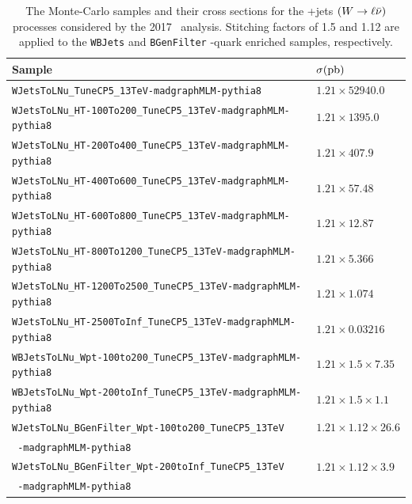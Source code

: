\begin{table}[htbp]
  \caption[\bosW+jets $(\bosW \rightarrow \ell\bar{\nu})$ Samples for \VHbb\ 2017]{The Monte-Carlo samples and their cross sections for the \bosW+jets $(\bosW \rightarrow \ell\bar{\nu})$ processes considered by the 2017 \VHbb\ analysis. Stitching factors of 1.5 and 1.12 are applied to the \texttt{WBJets} and \texttt{BGenFilter} \qrkb-quark enriched samples, respectively.}
  \label{tbl:MCWtoLNu}
  \small
  \begin{tabularx}{6.5in}{lX}
    \hline
    Sample                                                                 & $\sigma (\mathrm{pb})$                 \\
    \hline
    \texttt{WJetsToLNu\_TuneCP5\_13TeV-madgraphMLM-pythia8}                & $1.21 \times 52940.0$          \\
    \texttt{WJetsToLNu\_HT-100To200\_TuneCP5\_13TeV-madgraphMLM-pythia8}   & $1.21 \times 1395.0$           \\
    \texttt{WJetsToLNu\_HT-200To400\_TuneCP5\_13TeV-madgraphMLM-pythia8}   & $1.21 \times 407.9$            \\
    \texttt{WJetsToLNu\_HT-400To600\_TuneCP5\_13TeV-madgraphMLM-pythia8}   & $1.21 \times 57.48$            \\
    \texttt{WJetsToLNu\_HT-600To800\_TuneCP5\_13TeV-madgraphMLM-pythia8}   & $1.21 \times 12.87$            \\
    \texttt{WJetsToLNu\_HT-800To1200\_TuneCP5\_13TeV-madgraphMLM-pythia8}  & $1.21 \times 5.366$            \\
    \texttt{WJetsToLNu\_HT-1200To2500\_TuneCP5\_13TeV-madgraphMLM-pythia8} & $1.21 \times 1.074$            \\
    \texttt{WJetsToLNu\_HT-2500ToInf\_TuneCP5\_13TeV-madgraphMLM-pythia8}  & $1.21 \times 0.03216$          \\
    \texttt{WBJetsToLNu\_Wpt-100to200\_TuneCP5\_13TeV-madgraphMLM-pythia8} & $1.21 \times 1.5 \times 7.35$  \\
    \texttt{WBJetsToLNu\_Wpt-200toInf\_TuneCP5\_13TeV-madgraphMLM-pythia8} & $1.21 \times 1.5 \times 1.1$   \\
    \texttt{WJetsToLNu\_BGenFilter\_Wpt-100to200\_TuneCP5\_13TeV}          & $1.21 \times 1.12 \times 26.6$ \\
    \texttt{  -madgraphMLM-pythia8}                                        &                                \\
    \texttt{WJetsToLNu\_BGenFilter\_Wpt-200toInf\_TuneCP5\_13TeV}          & $1.21 \times 1.12 \times 3.9$  \\
    \texttt{  -madgraphMLM-pythia8}                                        &                                \\
    \hline
  \end{tabularx}
\end{table}

